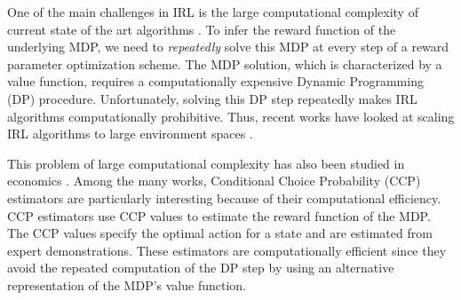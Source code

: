 \documentclass{article}
\begin{document}

One of the main challenges in IRL is the large computational complexity of current state of the art algorithms \cite{ziebart, Ratliff2006}. 
To infer the reward function of the underlying MDP, we need to \textit{repeatedly} solve this MDP at every step of a reward parameter optimization scheme.
The MDP solution, which is characterized by a value function, requires a computationally expensive Dynamic Programming (DP) procedure. Unfortunately, solving this DP step repeatedly makes IRL algorithms computationally prohibitive.
Thus, recent works have looked at scaling IRL algorithms to large environment spaces \cite{finn2016guided, levine2012continuous}.

This problem of large computational complexity has also been studied in economics \cite{hotz, su2012constrained, aguirregabiria2002swapping}.
Among the many works, Conditional Choice Probability (CCP) estimators \cite{hotz} are particularly interesting because of their computational efficiency.
CCP estimators use CCP values to estimate the reward function of the MDP.
The CCP values specify the optimal action for a state and are estimated from expert demonstrations.
These estimators are computationally efficient since they avoid the repeated computation of the DP step by using an alternative representation of the MDP's value function.
\end{document}
